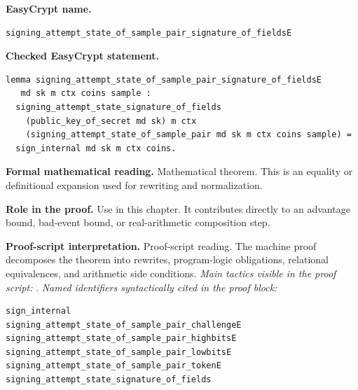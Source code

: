 \begin{formaltheorem}
\noindent\textbf{EasyCrypt name.}
\begin{lstlisting}[language=EasyCrypt,basicstyle=\ttfamily\scriptsize]
signing_attempt_state_of_sample_pair_signature_of_fieldsE
\end{lstlisting}
\noindent\textbf{Checked EasyCrypt statement.}
\begin{lstlisting}[language=EasyCrypt,basicstyle=\ttfamily\scriptsize]
lemma signing_attempt_state_of_sample_pair_signature_of_fieldsE
   md sk m ctx coins sample :
  signing_attempt_state_signature_of_fields
    (public_key_of_secret md sk) m ctx
    (signing_attempt_state_of_sample_pair md sk m ctx coins sample) =
  sign_internal md sk m ctx coins.
\end{lstlisting}
\noindent\textbf{Formal mathematical reading.}
Mathematical theorem. This is an equality or definitional expansion used for rewriting and normalization.

\noindent\textbf{Role in the proof.}
Use in this chapter. It contributes directly to an advantage bound, bad-event bound, or real-arithmetic composition step.

\noindent\textbf{Proof-script interpretation.}
Proof-script reading. The machine proof decomposes the theorem into rewrites, program-logic obligations, relational equivalences, and arithmetic side conditions.
\emph{Main tactics visible in the proof script:} .
\emph{Named identifiers syntactically cited in the proof block:}
\begin{lstlisting}[language=EasyCrypt,basicstyle=\ttfamily\scriptsize]
sign_internal
signing_attempt_state_of_sample_pair_challengeE
signing_attempt_state_of_sample_pair_highbitsE
signing_attempt_state_of_sample_pair_lowbitsE
signing_attempt_state_of_sample_pair_tokenE
signing_attempt_state_signature_of_fields
\end{lstlisting}

\end{formaltheorem}

